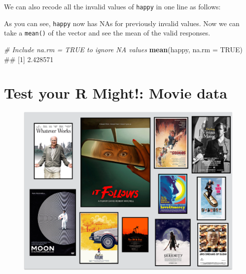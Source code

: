 \documentclass[]{book}
\newenvironment{Shaded}{\begin{snugshade}}{\end{snugshade}}
\newcommand{\KeywordTok}[1]{\textcolor[rgb]{0.13,0.29,0.53}{\textbf{{#1}}}}
\newcommand{\DataTypeTok}[1]{\textcolor[rgb]{0.13,0.29,0.53}{{#1}}}
\newcommand{\DecValTok}[1]{\textcolor[rgb]{0.00,0.00,0.81}{{#1}}}
\newcommand{\StringTok}[1]{\textcolor[rgb]{0.31,0.60,0.02}{{#1}}}
\newcommand{\CommentTok}[1]{\textcolor[rgb]{0.56,0.35,0.01}{\textit{{#1}}}}
\newcommand{\OtherTok}[1]{\textcolor[rgb]{0.56,0.35,0.01}{{#1}}}
\newcommand{\NormalTok}[1]{{#1}}
\theoremstyle{definition}
\theoremstyle{definition}
\theoremstyle{remark}
\begin{document}
We can also recode all the invalid values of \texttt{happy} in one line
as follows:

\begin{Shaded}
\end{Shaded}

As you can see, \texttt{happy} now has NAs for previously invalid
values. Now we can take a \texttt{mean()} of the vector and see the mean
of the valid responses.

\begin{Shaded}
\begin{Highlighting}[]
\CommentTok{# Include na.rm = TRUE to ignore NA values}
\KeywordTok{mean}\NormalTok{(happy, }\DataTypeTok{na.rm =} \OtherTok{TRUE}\NormalTok{)}
\NormalTok{## [1] 2.428571}
\end{Highlighting}
\end{Shaded}

\section{Test your R Might!: Movie
data}\label{test-your-r-might-movie-data}

\begin{figure}

{\centering \includegraphics[width=1\linewidth]{images/moviecollage} 

}

\end{figure}
\end{document}
